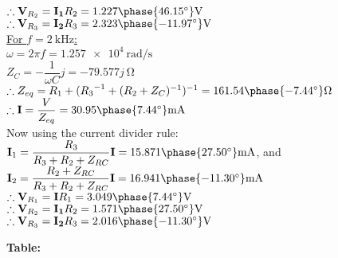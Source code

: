 \documentclass[12pt]{article}
\begin{document}
\begin{large}
	$ \therefore \mathbf{V}_{R_2} = \mathbf{I_1} R_2 = 1.227\phase{46.15^\circ} \SI{}{\V} $\\
	$ \therefore \mathbf{V}_{R_3} = \mathbf{I_2} R_3 = 2.323\phase{-11.97^\circ} \SI{}{\V} $\\[20pt]
	\underline{For $ f = \SI{2}{\kilo\hertz} $:}\\
	$ \omega = 2 \pi f = \SI{1.257e4}{\radian\per\s} $\\
	$ Z_C = - \dfrac{1}{\omega C} j = -79.577 j \SI{}{\ohm} $\\
	$ \therefore Z_{eq} = R_1 + ({R_3}^{-1} + (R_2 + Z_C)^{-1})^{-1} = 161.54\phase{-7.44^\circ} \SI{}{\ohm} $\\
	$ \therefore \mathbf{I} = \dfrac{V}{Z_{eq}} = 30.95\phase{7.44^\circ} \SI{}{\milli\A} $\\
	Now using the current divider rule:\\
	$ \mathbf{I}_1 = \dfrac{R_3}{R_3 + R_2 + Z_{RC}} \mathbf{I} = 15.871\phase{27.50^\circ} \SI{}{\milli\A} $, and\\
	$ \mathbf{I}_2 = \dfrac{R_2 + Z_{RC}}{R_3 + R_2 + Z_{RC}} \mathbf{I} = 16.941\phase{-11.30^\circ} \SI{}{\milli\A} $\\
	$ \therefore \mathbf{V}_{R_1} = \mathbf{I} R_1 = 3.049\phase{7.44^\circ} \SI{}{\V} $\\
	$ \therefore \mathbf{V}_{R_2} = \mathbf{I_1} R_2 = 1.571\phase{27.50^\circ} \SI{}{\V} $\\
	$ \therefore \mathbf{V}_{R_3} = \mathbf{I_2} R_3 = 2.016\phase{-11.30^\circ} \SI{}{\V} $\\

	\begin{table}[H]
		\textbf{Table:}\\[8pt]
		\caption{Theoretical values}
		\label{tab:theoretical_values}
	\end{table}


\end{large}
\end{document}
